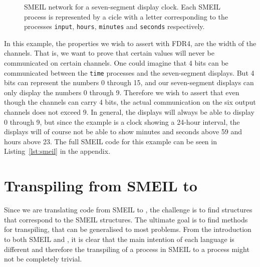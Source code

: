 \begin{figure}[!ht]
  \centering
  \caption{SMEIL network for a seven-segment display clock. Each SMEIL process is represented by a cicle with a letter corresponding to the processes \texttt{input}, \texttt{hours}, \texttt{minutes} and \texttt{seconds} respectively.}
  \label{fig:smeil_network}
\end{figure}

In this example, the properties we wish to assert with FDR4, are the width of the channels. That is, we want to prove that certain values will never be communicated on certain channels. One could imagine that 4 bits can be communicated between the \texttt{time} processes and the seven-segment displays. But 4 bits can represent the numbers 0 through 15, and our seven-segment displays can only display the numbers 0 through 9. Therefore we wish to assert that even though the channels can carry 4 bits, the actual communication on the six output channels does not exceed 9. In general, the displays will always be able to display 0 through 9, but since the example is a clock showing a 24-hour interval, the displays will of course not be able to show minutes and seconds above 59 and hours above 23. The full SMEIL code for this example can be seen in Listing~\ref{lst:smeil} in the appendix.
\section{Transpiling from SMEIL to \cspm{}}
\label{sec:transpiling}
Since we are translating code from SMEIL to \cspm{}, the challenge is to find \cspm{} structures that correspond to the SMEIL structures. The ultimate goal is to find methods for transpiling, that can be generalised to most problems. From the introduction to both SMEIL and \cspm, it is clear that the main intention of each language is different and therefore the transpiling of a process in SMEIL to a \cspm{} process might not be completely trivial.\\

